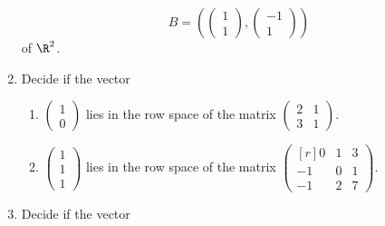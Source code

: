 \begin{enumerate}
 \[
  B = \left( 
  \begin{pmatrix}
   1\\
   1
  \end{pmatrix},
  \begin{pmatrix}
   -1\\
   1
  \end{pmatrix}
  \right)
 \]
 of $\R^2$.
\item 
 Decide if the vector
 \begin{enumerate}[label=(\alph*)]
  \item
  $
   \begin{pmatrix}
    1\\
    0
   \end{pmatrix}
  $
  lies in the row space of the matrix
  $
   \begin{pmatrix}
    2 & 1\\
    3 & 1
   \end{pmatrix}.
  $
  \item 
   $
   \begin{pmatrix}
    1\\
    1\\
    1
   \end{pmatrix}
   $ lies in the row space of the matrix
   $
   \begin{pmatrix*}[r]
    0 & 1 & 3\\
    -1 & 0 & 1\\
    -1 & 2 & 7
   \end{pmatrix*}
   $.
 \end{enumerate}
\item 
 Decide if the vector
\end{enumerate}
